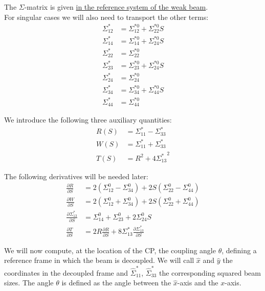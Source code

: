 The $\Sigma$-matrix is given \underline{in the reference system of the weak beam}.
~\\
For singular cases we will also need to transport the other terms:
\begin{align}
\Sigma^*_{12} &= \Sigma_{12} ^{*0}+\Sigma_{22} ^{*0}S\\
\Sigma^*_{14} &= \Sigma_{14} ^{*0}+\Sigma_{24} ^{*0}S\\
\Sigma^*_{22} &= \Sigma_{22} ^{*0}\\
\Sigma^*_{23} &= \Sigma_{23} ^{*0}+\Sigma_{24} ^{*0}S\\
\Sigma^*_{24} &= \Sigma_{24} ^{*0}\\
\Sigma^*_{34} &= \Sigma_{34} ^{*0}+\Sigma_{44} ^{*0}S\\
\Sigma^*_{44} &= \Sigma_{44} ^{*0}
\end{align}



We introduce the following three auxiliary quantities:
\begin{align}
R\left(S \right)  &= \Sigma^*_{11} - \Sigma^*_{33}\\
W\left(S\right) &= \Sigma^*_{11} + \Sigma^*_{33}\\
T\left( S \right) &= {R^2 + 4 {\Sigma^*_{13}}^2 } \label{eq:Tfun}
\end{align}

The following derivatives will be needed later:
\begin{align}
\frac{\partial R}{\partial S}  &= 2\left(\Sigma_{12} ^0 - \Sigma_{34}^0\right) + 2S\left(\Sigma_{22} ^0 - \Sigma_{44}^0\right) \\ 
\frac{\partial W}{\partial S} &= 2\left(\Sigma_{12} ^0 + \Sigma_{34}^0\right) + 2S\left(\Sigma_{22} ^0 + \Sigma_{44}^0\right) \\
\frac{\partial \Sigma^*_{13}}{\partial S}  &= \Sigma_{14} ^0 + \Sigma_{23} ^0 + 2\Sigma_{24} ^0 S\\
\frac{\partial T}{\partial S}  &= 2R \frac{\partial R}{\partial  S} +8  \Sigma^*_{13} \frac{\partial \Sigma^*_{13}}{\partial  S}
\end{align}

We will now compute, at the location of the CP, the coupling angle $\theta$, defining a reference frame in which the beam is decoupled.
We will call $\hat{x}$ and $\hat{y}$ the coordinates in the decoupled frame and  $\hat{\Sigma}^*_{11}$,  $\hat{\Sigma}^*_{33}$ the corresponding squared beam sizes. The angle $\theta$ is defined as the angle between the $\hat{x}$-axis and the $x$-axis.


